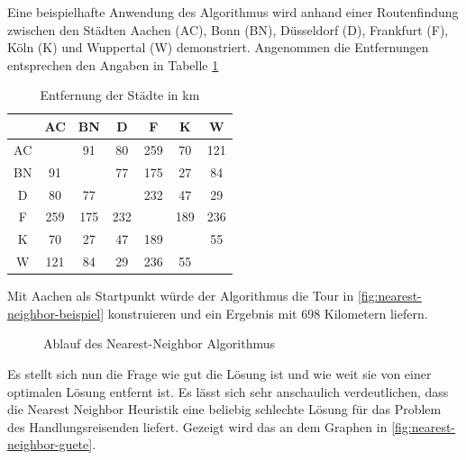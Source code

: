 \documentclass{article}
\begin{document}
Eine beispielhafte Anwendung des Algorithmus wird anhand einer Routenfindung zwischen den Städten Aachen (AC), Bonn (BN), Düsseldorf (D), Frankfurt (F), Köln (K) und Wuppertal (W) demonstriert. Angenommen die Entfernungen entsprechen den Angaben in Tabelle \ref{tbl:opt-struktur-select-reduktion}

\begin{table}
\centering
\begin{tabular}{ |c|c|c|c|c|c|c| }
\hline
 & AC & BN & D& F & K & W \\ 
\hline
AC &  & 91 & 80 & 259 & 70 & 121 \\ 
\hline
BN & 91 &  & 77 & 175 & 27 & 84 \\ 
\hline
D & 80 & 77 &  & 232 & 47 & 29 \\ 
\hline
F & 259 & 175 & 232 &  & 189 & 236 \\ 
\hline
K & 70 & 27 & 47 & 189 &  & 55 \\ 
\hline
W & 121 & 84 & 29 & 236 & 55 &  \\ 
\hline
\end{tabular}
\caption{Entfernung der Städte in km}
\label{tbl:opt-struktur-select-reduktion}
\end{table}

Mit Aachen als Startpunkt würde der Algorithmus die Tour in \autoref{fig:nearest-neighbor-beispiel} konstruieren und ein Ergebnis mit 698 Kilometern liefern.

\begin{figure}[H]
\centering
{}
\caption{Ablauf des Nearest-Neighbor Algorithmus}
\label{fig:nearest-neighbor-beispiel}
\end{figure}

Es stellt sich nun die Frage wie gut die Lösung ist und wie weit sie von einer optimalen Lösung entfernt ist. Es lässt sich sehr anschaulich verdeutlichen, dass die Nearest Neighbor Heuristik eine beliebig schlechte Lösung für das Problem des Handlungsreisenden liefert. Gezeigt wird das an dem Graphen in \autoref{fig:nearest-neighbor-guete}.
\end{document}
